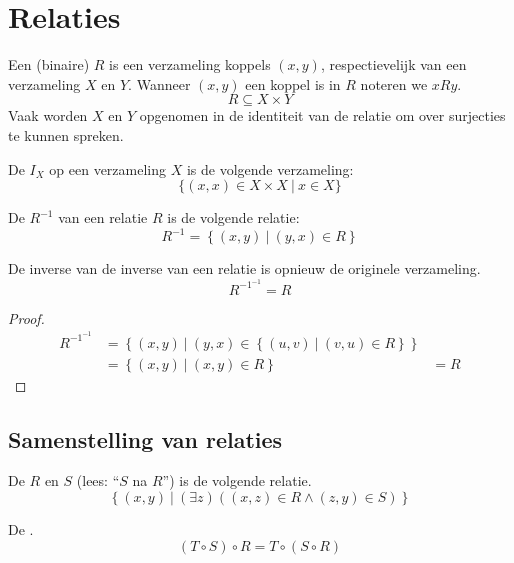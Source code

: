 \documentclass[main.tex]{subfiles}
\begin{document}
\chapter{Relaties}
\label{cha:relaties}

\begin{de}
  Een (binaire)  $R$ is een verzameling koppels $(x,y)$, respectievelijk van een verzameling $X$ en $Y$. 
  Wanneer $(x,y)$ een koppel is in $R$ noteren we $x R y$.
  \[ R \subseteq X \times Y \]
  Vaak worden $X$ en $Y$ opgenomen in de identiteit van de relatie om over surjecties te kunnen spreken.
\end{de}

\begin{de}
  De  $I_{X}$ op een verzameling $X$ is de volgende verzameling:
  \[ \{(x,x) \in X \times X\ |\ x \in X \} \]
\end{de}

\begin{de}
  De  $R^{-1}$ van een relatie $R$ is de volgende relatie:
  \[ R^{-1} = \left\{ (x,y)\ |\ (y,x) \in R \right\} \]
\end{de}

\begin{st}
  De inverse van de inverse van een relatie is opnieuw de originele verzameling.
  \[ R^{-1^{-1}} = R \]

  \begin{proof}
    \[
    \begin{array}{rll}
      R^{-1^{-1}} &= \left\{ (x,y)\ |\ (y,x) \in \left\{ (u,v)\ |\ (v,u) \in R \right\} \right\} &\\
                &= \left\{ (x,y)\ |\ (x,y) \in R \right\} &= R
    \end{array}
    \]
  \end{proof}
\end{st}

\section{Samenstelling van relaties}
\label{sec:samenst-van-relat}

\begin{de}
  De  $R$ en $S$ (lees: ``$S$ na $R$'') is de volgende relatie.
  \[ \left\{ (x,y) \ |\ (\exists z) ((x,z) \in R \wedge (z,y) \in S) \right\} \]
\end{de}

\begin{st}
  \label{st:samenstelling-relaties-associatief}
  De .
  \[ (T \circ S) \circ R = T \circ (S \circ R) \]
\end{st}
\end{document}
